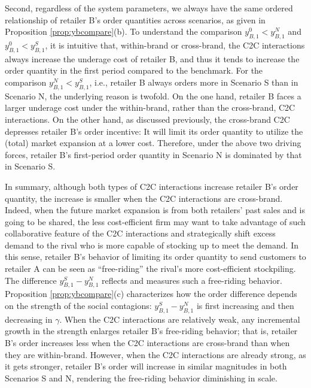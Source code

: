 \documentclass[nonblindrev,copyedit]{informs1}
\begin{document}
Second, regardless of the system parameters, we always have the same ordered relationship of retailer B's order quantities across scenarios, as given in Proposition \ref{prop:ybcompare}(b). To understand the comparison $y^{0}_{B,1} < y^{N}_{B,1}$ and $y^{0}_{B,1} < y^{S}_{B,1}$, it is intuitive that, within-brand or cross-brand, the C2C interactions always increase the underage cost of retailer B, and thus it tends to increase the order quantity in the first period compared to the benchmark. For the comparison $y^{N}_{B,1} < y^{S}_{B,1}$, i.e., retailer B always orders more in Scenario S than in Scenario N, the underlying reason is twofold. On the one hand, retailer B faces a larger underage cost under the within-brand, rather than the cross-brand, C2C interactions. On the other hand, as discussed previously, the cross-brand C2C depresses retailer B's order incentive: It will limit its order quantity to utilize the (total) market expansion at a lower cost. Therefore, under the above two driving forces, retailer B's first-period order quantity in Scenario N is dominated by that in Scenario S.

In summary, although both types of C2C interactions increase retailer B's order quantity, the increase is smaller when the C2C interactions are cross-brand. Indeed, when the future market expansion is from both retailers' past sales and is going to be shared, the less cost-efficient firm may want to take advantage of such collaborative feature of the C2C interactions and strategically shift excess demand to the rival who is more capable of stocking up to meet the demand. In this sense, retailer B's behavior of limiting its order quantity to send customers to retailer A can be seen as ``free-riding'' the rival's more cost-efficient stockpiling. The difference $y^{S}_{B,1}-y^{N}_{B,1}$ reflects and measures such a free-riding behavior. Proposition \ref{prop:ybcompare}(c) characterizes how the order difference depends on the strength of the social contagions: $y^{S}_{B,1}-y^{N}_{B,1}$ is first increasing and then decreasing in $\gamma$. When the C2C interactions are relatively weak, any incremental growth in the strength enlarges retailer B's free-riding behavior; that is, retailer B's order increases less when the C2C interactions are cross-brand than when they are within-brand. However, when the C2C interactions are already strong, as it gets stronger, retailer B's order will increase in similar magnitudes in both Scenarios S and N, rendering the free-riding behavior diminishing in scale.
\end{document}
